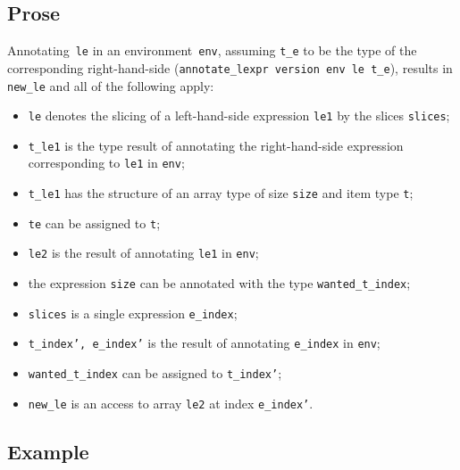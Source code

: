 \documentclass{book}
\begin{document}
  \subsection{Prose}
   Annotating~\texttt{le} in an environment~\texttt{env}, assuming
\texttt{t\_e} to be the type of the corresponding right-hand-side
(\texttt{annotate\_lexpr version env le t\_e}), results in \texttt{new\_le} and
all of the following apply:
   \begin{itemize}
   \item \texttt{le} denotes the slicing of a left-hand-side expression \texttt{le1} by the slices \texttt{slices};
   \item \texttt{t\_le1} is the type result of annotating the right-hand-side expression corresponding to \texttt{le1} in \texttt{env};
   \item \texttt{t\_le1} has the structure of an array type of size \texttt{size} and item type \texttt{t};
   \item \texttt{te} can be assigned to \texttt{t};
   \item \texttt{le2} is the result of annotating \texttt{le1} in \texttt{env};
  \item the expression \texttt{size} can be annotated with the type \texttt{wanted\_t\_index};
  \item \texttt{slices} is a single expression \texttt{e\_index};
   \item \texttt{t\_index', e\_index'} is the result of annotating \texttt{e\_index} in \texttt{env};
   \item \texttt{wanted\_t\_index} can be assigned to \texttt{t\_index'};
   \item \texttt{new\_le} is an access to array \texttt{le2} at index \texttt{e\_index'}.  
   \end{itemize}

  \subsection{Example}
\end{document}
